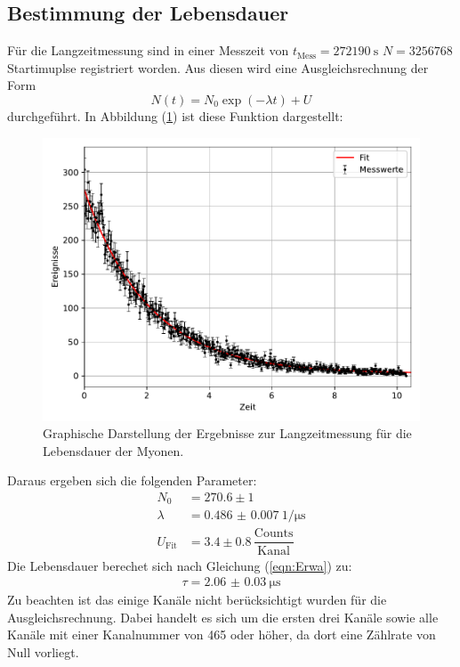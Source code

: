 \subsection{Bestimmung der Lebensdauer}
Für die Langzeitmessung sind in einer Messzeit von $t_\mathrm{Mess}=\SI{272190}{\second}$ $N=3256768$ Startimuplse registriert worden.
Aus diesen wird eine Ausgleichsrechnung der Form
\begin{equation}
	N(t)=N_\mathrm{0} \exp(-\lambda t) + U
\end{equation}
durchgeführt. In Abbildung (\ref{fig:spekt}) ist diese Funktion dargestellt:
\begin{figure}
	\centering
	\includegraphics[scale=0.7]{fig/spektrum1_fit.pdf}
	\caption{Graphische Darstellung der Ergebnisse zur Langzeitmessung für die Lebensdauer der Myonen.}
	\label{fig:spekt}
\end{figure}
\FloatBarrier
\noindent Daraus ergeben sich die folgenden Parameter:
\begin{align*}
	N_\mathrm{0} &= 270.6\pm1 \\
	\lambda &= \SI{0.486(7)}{1\per\micro\second} \\
	U_\mathrm{Fit} &= 3.4\pm0.8 \, \dfrac{\mathrm{Counts}}{\mathrm{Kanal}}
\end{align*}
Die Lebensdauer berechet sich nach Gleichung (\ref{eqn:Erwa}) zu:
\begin{align*}
	\tau = \SI{2.06(3)}{\micro\second}
\end{align*}
Zu beachten ist das einige Kanäle nicht berücksichtigt wurden für die Ausgleichsrechnung. Dabei handelt es sich um die ersten drei Kanäle sowie alle Kanäle mit einer Kanalnummer von 465 oder höher, da dort eine Zählrate von Null vorliegt.

